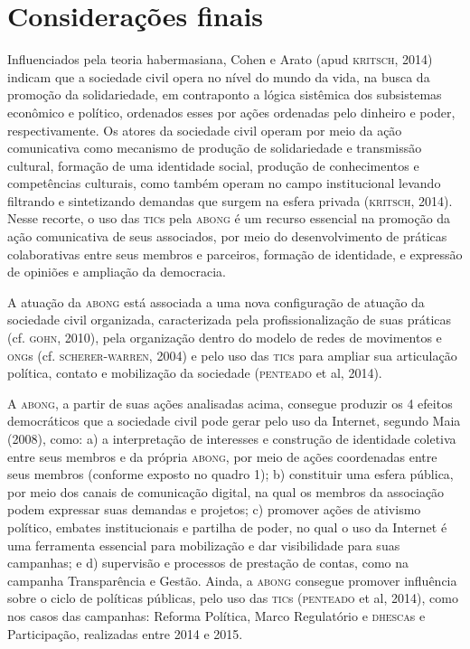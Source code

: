\section{Considerações finais}

\noindent{}Influenciados pela teoria habermasiana, Cohen e Arato (apud \textsc{kritsch},
2014) indicam que a sociedade civil opera no nível do mundo da vida, na
busca da promoção da solidariedade, em contraponto a lógica sistêmica
dos subsistemas econômico e político, ordenados esses por ações
ordenadas pelo dinheiro e poder, respectivamente. Os atores da sociedade
civil operam por meio da ação comunicativa como mecanismo de produção de
solidariedade e transmissão cultural, formação de uma identidade social,
produção de conhecimentos e competências culturais, como também operam
no campo institucional levando filtrando e sintetizando demandas que
surgem na esfera privada (\textsc{kritsch}, 2014). Nesse recorte, o uso das \textsc{tic}s
pela \textsc{abong} é um recurso essencial na promoção da ação comunicativa de
seus associados, por meio do desenvolvimento de práticas colaborativas
entre seus membros e parceiros, formação de identidade, e expressão de
opiniões e ampliação da democracia.

A atuação da \textsc{abong} está associada a uma nova configuração de atuação da
sociedade civil organizada, caracterizada pela profissionalização de
suas práticas (cf. \textsc{gohn}, 2010), pela organização dentro do modelo de
redes de movimentos e \textsc{ong}s (cf. \textsc{scherer}-\textsc{warren}, 2004) e pelo uso das
\textsc{tic}s para ampliar sua articulação política, contato e mobilização da
sociedade (\textsc{penteado} et al, 2014).

A \textsc{abong}, a partir de suas ações analisadas acima, consegue produzir os 4
efeitos democráticos que a sociedade civil pode gerar pelo uso da
Internet, segundo Maia (2008), como: a) a interpretação de interesses e
construção de identidade coletiva entre seus membros e da própria \textsc{abong},
por meio de ações coordenadas entre seus membros (conforme exposto no
quadro 1); b) constituir uma esfera pública, por meio dos canais de
comunicação digital, na qual os membros da associação podem expressar
suas demandas e projetos; c) promover ações de ativismo político,
embates institucionais e partilha de poder, no qual o uso da Internet é
uma ferramenta essencial para mobilização e dar visibilidade para suas
campanhas; e d) supervisão e processos de prestação de contas, como na
campanha Transparência e Gestão. Ainda, a \textsc{abong} consegue promover
influência sobre o ciclo de políticas públicas, pelo uso das \textsc{tic}s
(\textsc{penteado} et al, 2014), como nos casos das campanhas: Reforma Política,
Marco Regulatório e \textsc{dhesca}s e Participação, realizadas entre 2014 e
2015.

